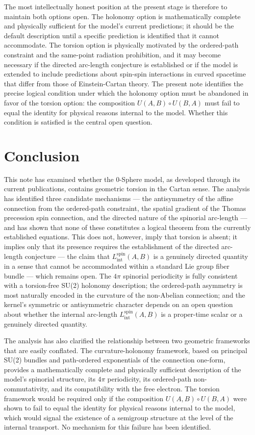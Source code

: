 \documentclass[%
 reprint,
 amsmath,amssymb,
 aps,
 prb,
]{revtex4-2}
\numberwithin{equation}{section}
\newcommand{\Lspin}{L_{\text{int}}^{\text{spin}}}
\begin{document}
The most intellectually honest position at the present stage is therefore to maintain both options open. The holonomy option is mathematically complete and physically sufficient for the model's current predictions; it should be the default description until a specific prediction is identified that it cannot accommodate. The torsion option is physically motivated by the ordered-path constraint and the same-point radiation prohibition, and it may become necessary if the directed arc-length conjecture is established or if the model is extended to include predictions about spin-spin interactions in curved spacetime that differ from those of Einstein-Cartan theory. The present note identifies the precise logical condition under which the holonomy option must be abandoned in favor of the torsion option: the composition $U(A,B)\circ U(B,A)$ must fail to equal the identity for physical reasons internal to the model. Whether this condition is satisfied is the central open question.

\section{Conclusion}
\label{sec:conclusion}

This note has examined whether the 0-Sphere model, as developed through its current publications, contains geometric torsion in the Cartan sense. The analysis has identified three candidate mechanisms --- the antisymmetry of the affine connection from the ordered-path constraint, the spatial gradient of the Thomas precession spin connection, and the directed nature of the spinorial arc-length --- and has shown that none of these constitutes a logical theorem from the currently established equations. This does not, however, imply that torsion is absent; it implies only that its presence requires the establishment of the directed arc-length conjecture --- the claim that $\Lspin(A,B)$ is a genuinely directed quantity in a sense that cannot be accommodated within a standard Lie group fiber bundle --- which remains open. The $4\pi$ spinorial periodicity is fully consistent with a torsion-free SU(2) holonomy description; the ordered-path asymmetry is most naturally encoded in the curvature of the non-Abelian connection; and the kernel's symmetric or antisymmetric character depends on an open question about whether the internal arc-length $\Lspin(A,B)$ is a proper-time scalar or a genuinely directed quantity.

The analysis has also clarified the relationship between two geometric frameworks that are easily conflated. The curvature-holonomy framework, based on principal SU(2) bundles and path-ordered exponentials of the connection one-form, provides a mathematically complete and physically sufficient description of the model's spinorial structure, its $4\pi$ periodicity, its ordered-path non-commutativity, and its compatibility with the free electron. The torsion framework would be required only if the composition $U(A,B)\circ U(B,A)$ were shown to fail to equal the identity for physical reasons internal to the model, which would signal the existence of a semigroup structure at the level of the internal transport. No mechanism for this failure has been identified.
\end{document}
